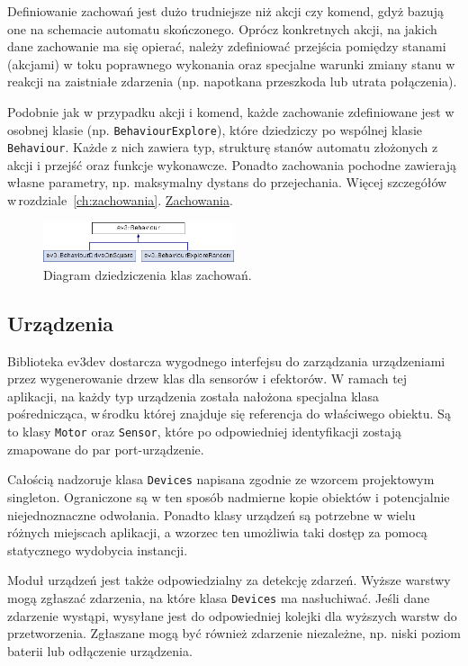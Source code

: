 \indent \indent Definiowanie zachowań jest dużo trudniejsze niż akcji czy komend, gdyż bazują one na schemacie automatu skończonego. Oprócz konkretnych akcji, na jakich dane zachowanie ma się opierać, należy zdefiniować przejścia pomiędzy stanami (akcjami) w toku poprawnego wykonania oraz specjalne warunki zmiany stanu w\,reakcji na zaistniałe zdarzenia (np. napotkana przeszkoda lub utrata połączenia).

Podobnie jak w przypadku akcji i komend, każde zachowanie zdefiniowane jest w osobnej klasie (np. {\tt BehaviourExplore}), które dziedziczy po wspólnej klasie {\tt Behaviour}. Każde z nich zawiera typ, strukturę stanów automatu złożonych z\,akcji i przejść oraz funkcje wykonawcze. Ponadto zachowania pochodne zawierają własne parametry, np. maksymalny dystans do przejechania. Więcej szczegółów w\,rozdziale~\ref{ch:zachowania}. \hyperref[ch:zachowania]{Zachowania}.

\begin{figure}[!ht]
    \centering
        \includegraphics[width=0.5\textwidth]{diagrams/behaviour_class.png}
    \caption{Diagram dziedziczenia klas zachowań.\label{fig:behaviour_class}}
\end{figure}

\subsection{Urządzenia}

\indent \indent Biblioteka ev3dev dostarcza wygodnego interfejsu do zarządzania urządzeniami przez wygenerowanie drzew klas dla sensorów i efektorów. W ramach tej aplikacji, na każdy typ urządzenia została nałożona specjalna klasa pośrednicząca, w\,środku której znajduje się referencja do właściwego obiektu. Są to klasy {\tt Motor} oraz {\tt Sensor}, które po odpowiedniej identyfikacji zostają zmapowane do par port-urządzenie.

Całością nadzoruje klasa {\tt Devices} napisana zgodnie ze wzorcem projektowym \gls{singleton}. Ograniczone są w ten sposób nadmierne kopie obiektów i potencjalnie niejednoznaczne odwołania. Ponadto klasy urządzeń są potrzebne w wielu różnych miejscach aplikacji, a wzorzec ten umożliwia taki dostęp za pomocą statycznego wydobycia instancji.

Moduł urządzeń jest także odpowiedzialny za detekcję zdarzeń. Wyższe warstwy mogą zgłaszać zdarzenia, na które klasa {\tt Devices} ma nasłuchiwać. Jeśli dane zdarzenie wystąpi, wysyłane jest do odpowiedniej kolejki dla wyższych warstw do\,przetworzenia. Zgłaszane mogą być również zdarzenie niezależne, np. niski poziom baterii lub odłączenie urządzenia.

